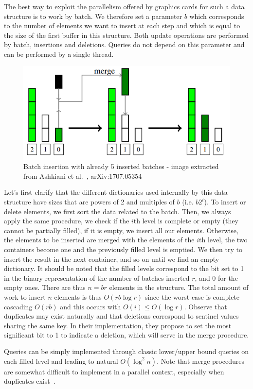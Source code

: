 The best way to exploit the parallelism offered by graphics cards for such a data structure is to work by batch. We therefore set a parameter $b$ which corresponds to the number of elements we want to insert at each step and which is equal to the size of the first buffer in this structure. Both update operations are performed by batch, insertions and deletions. Queries do not depend on this parameter and can be performed by a single thread.

\begin{figure}[!htb]
    \centering
    \includegraphics[width=0.75\linewidth]{Chapters/ParallelXFastTries/LSM.png} 
    \caption{Batch insertion with already 5 inserted batches - image extracted from Ashkiani et al.~\cite{ashkiani2017gpu}, arXiv:1707.05354}
\end{figure}

Let's first clarify that the different dictionaries used internally by this data structure have sizes that are powers of 2 and multiples of $b$ (i.e. $b2^{i}$). To insert or delete elements, we first sort the data related to the batch. Then, we always apply the same procedure, we check if the $i$th level is complete or empty (they cannot be partially filled), if it is empty, we insert all our elements. Otherwise, the elements to be inserted are merged with the elements of the $i$th level, the two containers become one and the previously filled level is emptied. We then try to insert the result in the next container, and so on until we find an empty dictionary. It should be noted that the filled levels correspond to the bit set to 1 in the binary representation of the number of batches inserted $r$, and 0 for the empty ones. There are thus $n = br$ elements in the structure. The total amount of work to insert $n$ elements is thus $O(rb \log r)$ since the worst case is complete cascading $O(rb)$ and this occurs with $O(i) \leq O(\log r)$. Observe that duplicates may exist naturally and that deletions correspond to sentinel values sharing the same key. In their implementation, they propose to set the most significant bit to 1 to indicate a deletion, which will serve in the merge procedure.

Queries can be simply implemented through classic lower/upper bound queries on each filled level and leading to natural $O(\log^{2} n)$. Note that merge procedures are somewhat difficult to implement in a parallel context, especially when duplicates exist~\cite{green2012gpu}.